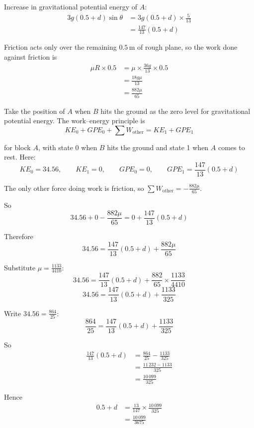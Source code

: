 \documentclass[leqno]{article}
\begin{document}
\begin{enumerate}[
  label=\textbf{\arabic*.},
  leftmargin=*,
  topsep=0pt,
  partopsep=0pt,
  parsep=0pt
]
\begin{djsSolution}
\begin{enumerate}[label=\textbf{(\alph*)}]
  Increase in gravitational potential energy of \(A\):
  \begin{align*}
  3g(0.5+d)\sin\theta
  &=3g(0.5+d)\times \frac{5}{13}\\
  &=\frac{147}{13}(0.5+d)
  \end{align*}

  Friction acts only over the remaining \(0.5\,\mathrm{m}\) of rough plane, so the work done against friction is
  \begin{align*}
  \mu R \times 0.5
  &=\mu\times \frac{36g}{13}\times 0.5\\
  &=\frac{18g\mu}{13}\\
  &=\frac{882\mu}{65}
  \end{align*}

  Take the position of \(A\) when \(B\) hits the ground as the zero level for gravitational potential energy. The work--energy principle is
  \[
  KE_0+GPE_0+\sum W_{\text{other}}=KE_1+GPE_1
  \]

  for block \(A\), with state 0 when \(B\) hits the ground and state 1 when \(A\) comes to rest. Here:
  \[
  KE_0=34.56,\qquad KE_1=0,\qquad GPE_0=0,\qquad GPE_1=\frac{147}{13}(0.5+d)
  \]

  The only other force doing work is friction, so \(\sum W_{\text{other}}=-\frac{882\mu}{65}\).

  So
  \[
  34.56+0-\frac{882\mu}{65}=0+\frac{147}{13}(0.5+d)
  \]

  Therefore
  \[
  34.56=\frac{147}{13}(0.5+d)+\frac{882\mu}{65}
  \]

  Substitute \(\mu=\frac{1133}{4410}\):
  \[
  34.56=\frac{147}{13}(0.5+d)+\frac{882}{65}\times \frac{1133}{4410}
  \]
  \[
  34.56=\frac{147}{13}(0.5+d)+\frac{1133}{325}
  \]

  Write \(34.56=\frac{864}{25}\):
  \[
  \frac{864}{25}=\frac{147}{13}(0.5+d)+\frac{1133}{325}
  \]

  So
  \begin{align*}
  \frac{147}{13}(0.5+d)
  &=\frac{864}{25}-\frac{1133}{325}\\
  &=\frac{11\,232-1133}{325}\\
  &=\frac{10\,099}{325}
  \end{align*}

  Hence
  \begin{align*}
  0.5+d
  &=\frac{13}{147}\times \frac{10\,099}{325}\\
  &=\frac{10\,099}{3675}
  \end{align*}


\end{enumerate}
\end{djsSolution}
\end{enumerate}
\end{document}
